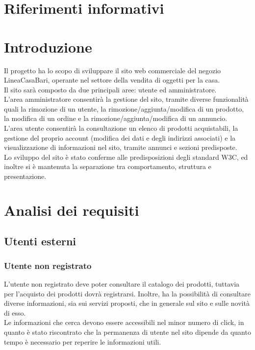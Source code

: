 




\makeFrontPage
\clearpage
\tableofcontents
\listoffigures
\clearpage

\section{Riferimenti informativi}

\section{Introduzione}
Il progetto ha lo scopo di sviluppare il sito web commerciale del negozio LineaCasaBari, operante nel settore della vendita di oggetti per la casa. \\
Il sito sarà composto da due principali aree: utente ed amministratore. \\
L'area amministratore consentirà la gestione del sito, tramite diverse funzionalità quali la rimozione di un utente, la rimozione/aggiunta/modifica di un prodotto, la modifica di un ordine e la rimozione/aggiunta/modifica di un annuncio. \\
L'area utente consentirà la consultazione un elenco di prodotti acquistabili, la gestione del proprio account (modifica dei dati e degli indirizzi associati) e la visualizzazione di informazioni nel sito, tramite annunci e sezioni predisposte. \\
Lo sviluppo del sito è stato conferme alle predisposizioni degli standard W3C, ed inoltre si è mantenuta la separazione tra comportamento, struttura e presentazione.

\section{Analisi dei requisiti} %
	\subsection{Utenti esterni}
		\subsubsection{Utente non registrato}
		L'utente non registrato deve poter consultare il catalogo dei prodotti, tuttavia per l'acquisto dei prodotti dovrà registrarsi. Inoltre, ha la possibilità di consultare diverse informazioni, sia sui servizi proposti, che in generale sul sito e sulle novità di esso.  \\
		Le informazioni che cerca devono essere accessibili nel minor numero di click, in quanto è stato riscontrato che la permanenza di utente nel sito dipende da quanto tempo è necessario per reperire le informazioni utili.
		

